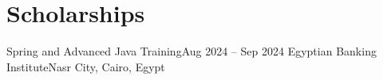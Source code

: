 \section{Scholarships}
  \resumeSubHeadingListStart

    \resumeSubheading
      {Spring and Advanced Java Training}{Aug 2024 -- Sep 2024}
      {Egyptian Banking Institute}{Nasr City, Cairo, Egypt}
      \resumeItemListStart
      \resumeItemListEnd

  \resumeSubHeadingListEnd
